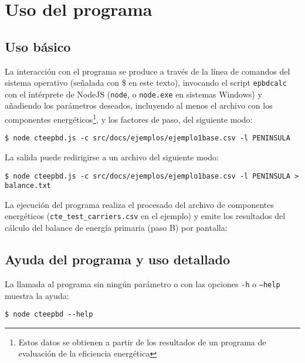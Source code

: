 \documentclass[10pt,notitlepage,oneside,a4paper]{article}
\begin{document}
\clearpage
\newpage
\section{Uso del programa}
\label{sec:usoprograma}

\subsection{Uso básico}

La interacción con el programa se produce a través de la línea de comandos del sistema operativo (señalada con \$ en este texto), invocando el script \texttt{epbdcalc} con el intérprete de NodeJS (\texttt{node}, o \texttt{node.exe} en sistemas Windows) y añadiendo los parámetros deseados, incluyendo al menos el archivo con los componentes energéticos\footnote{Estos datos se obtienen a partir de los resultados de un programa de evaluación de la eficiencia energética}, y los factores de paso, del siguiente modo:

\begin{Verbatim}[fontsize=\small]
	$ node cteepbd.js -c src/docs/ejemplos/ejemplo1base.csv -l PENINSULA
\end{Verbatim}

La salida puede redirigirse a un archivo del siguiente modo:

\begin{Verbatim}[fontsize=\small]
	$ node cteepbd.js -c src/docs/ejemplos/ejemplo1base.csv -l PENINSULA > balance.txt
\end{Verbatim}

La ejecución del programa realiza el procesado del archivo de componentes energéticos
(\texttt{cte\_test\_carriers.csv} en el ejemplo) y emite los resultados  del cálculo del balance de energía primaria (paso B) por pantalla:


\clearpage
\newpage
\subsection{Ayuda del programa y uso detallado}
La llamada al programa sin ningún parámetro o con las opciones \texttt{-h} o \texttt{--help} muestra la ayuda:

\begin{Verbatim}[fontsize=\small]
	$ node cteepbd --help
\end{Verbatim}
\end{document}

